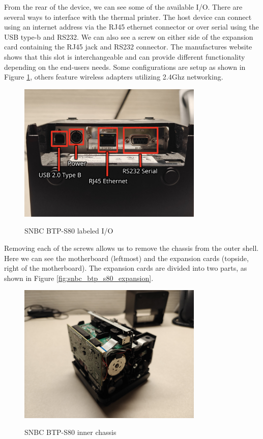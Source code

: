 From the rear of the device, we can see some of the available I/O. There are several ways to interface with the thermal printer. The host device can connect using an internet address via the RJ45 ethernet connector or over serial using the USB type-b and RS232. We can also see a screw on either side of the expansion card containing the RJ45 jack and RS232 connector. The manufactures website shows that this slot is interchangeable and can provide different functionality depending on the end-users needs. Some configurations are setup as shown in Figure \ref{fig:snbc_btp_s80_io}, others feature wireless adapters utilizing 2.4Ghz networking.

\begin{figure}[ht]
    \centering
    {\includegraphics[width=88mm,scale=0.5]
    {Figures/Teardown/IMG20231204170442_annotated.jpg}}
    \caption{SNBC BTP-S80 labeled I/O}
    \label{fig:snbc_btp_s80_io}
\end{figure}

Removing each of the screws allows us to remove the chassis from the outer shell. Here we can see the motherboard (leftmost) and the expansion cards (topside, right of the motherboard). The expansion cards are divided into two parts, as shown in Figure \ref{fig:snbc_btp_s80_expansion}.

\begin{figure}[ht]
    \centering
    {\includegraphics[width=88mm,scale=0.5]
    {Figures/Teardown/IMG20231204170938.jpg}}
    \caption{SNBC BTP-S80 inner chassis}
    \label{fig:snbc_btp_s80_chassis}
\end{figure}

